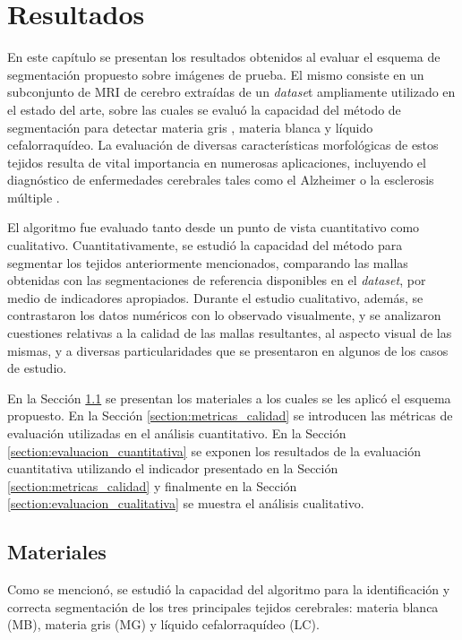\chapter{Resultados}\label{chap:resultados}
En este capítulo se presentan los resultados obtenidos al evaluar el esquema de segmentación propuesto sobre imágenes de prueba. El mismo consiste en un subconjunto de MRI de cerebro extraídas de un \emph{datase}t ampliamente utilizado en el estado del arte, sobre las cuales se evaluó la capacidad del método de segmentación para detectar materia gris , materia blanca y líquido cefalorraquídeo. La evaluación de diversas características morfológicas de estos tejidos resulta de vital importancia en numerosas aplicaciones, incluyendo el diagnóstico de enfermedades cerebrales tales como el Alzheimer o la esclerosis múltiple \citep{kovacevic2002robust}.

El algoritmo fue evaluado tanto desde un punto de vista cuantitativo como cualitativo. Cuantitativamente, se estudió la capacidad del método para segmentar los tejidos anteriormente mencionados, comparando las mallas obtenidas con las segmentaciones de referencia disponibles en el \emph{dataset}, por medio de indicadores apropiados. Durante el estudio cualitativo, además, se contrastaron los datos numéricos con lo observado visualmente, y se analizaron cuestiones relativas a la calidad de las mallas resultantes, al aspecto visual de las mismas, y a diversas particularidades que se presentaron en algunos de los casos de estudio.

En la Sección \ref{section:datos_usados} se presentan los materiales a los cuales se les aplicó el esquema propuesto. En la Sección \ref{section:metricas_calidad} se introducen las métricas de evaluación utilizadas en el análisis cuantitativo. En la Sección \ref{section:evaluacion_cuantitativa} se exponen los resultados de la evaluación cuantitativa utilizando el indicador presentado en la Sección \ref{section:metricas_calidad} y finalmente en la Sección \ref{section:evaluacion_cualitativa} se muestra el análisis cualitativo.

\section{Materiales}\label{section:datos_usados}
Como se mencionó, se estudió la capacidad del algoritmo para la identificación y correcta segmentación de los tres principales tejidos cerebrales: materia blanca  (MB), materia gris (MG) y líquido cefalorraquídeo (LC).

